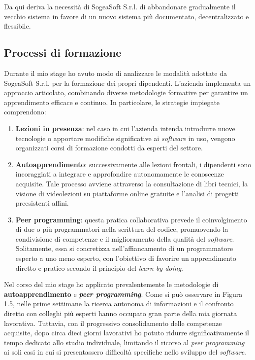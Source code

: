         \noindent Da qui deriva la necessità di SogeaSoft S.r.l. di abbandonare gradualmente il vecchio sistema in favore di un nuovo sistema più documentato, decentralizzato e flessibile. 
        
        \subsection{Processi di formazione}

        Durante il mio stage ho avuto modo di analizzare le modalità adottate da SogeaSoft S.r.l. per la formazione dei propri dipendenti. L'azienda implementa un approccio articolato, combinando diverse metodologie formative per garantire un apprendimento efficace e continuo. In particolare, le strategie impiegate comprendono:

        \begin{enumerate}
        \item \textbf{Lezioni in presenza}: nel caso in cui l’azienda intenda introdurre nuove tecnologie o apportare modifiche significative ai \textit{software} in uso, vengono organizzati corsi di formazione condotti da esperti del settore.

        \item \textbf{Autoapprendimento}: successivamente alle lezioni frontali, i dipendenti sono incoraggiati a integrare e approfondire autonomamente le conoscenze acquisite. Tale processo avviene attraverso la consultazione di libri tecnici, la visione di videolezioni su piattaforme online gratuite e l’analisi di progetti preesistenti affini.

        \item \textbf{Peer programming}: questa pratica collaborativa prevede il coinvolgimento di due o più programmatori nella scrittura del codice, promuovendo la condivisione di competenze e il miglioramento della qualità del \textit{software}. Solitamente, essa si concretizza nell’affiancamento di un programmatore esperto a uno meno esperto, con l’obiettivo di favorire un apprendimento diretto e pratico secondo il principio del \textit{learn by doing}.
        \end{enumerate}
        
        \noindent Nel corso del mio stage ho applicato prevalentemente le metodologie di \textbf{autoapprendimento} e \textit{\textbf{peer programming}}. Come si può osservare in Figura 1.5, nelle prime settimane la ricerca autonoma di informazioni e il confronto diretto con colleghi più esperti hanno occupato gran parte della mia giornata lavorativa. Tuttavia, con il progressivo consolidamento delle competenze acquisite, dopo circa dieci giorni lavorativi ho potuto ridurre significativamente il tempo dedicato allo studio individuale, limitando il ricorso al \textit{peer programming} ai soli casi in cui si presentassero difficoltà specifiche nello sviluppo del \textit{software}.

